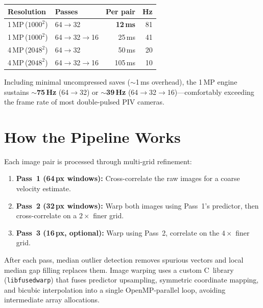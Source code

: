 \documentclass[10pt,a4paper,twocolumn]{article}
\begin{document}
\begin{center}
\small
\begin{tabular}{@{}llrr@{}}
\toprule
\textbf{Resolution} & \textbf{Passes} & \textbf{Per pair} & \textbf{Hz} \\
\midrule
1\,MP\,($1000^2$)  & 64$\to$32       & \textbf{12\,ms}  & 81 \\
1\,MP\,($1000^2$)  & 64$\to$32$\to$16 & 25\,ms          & 41 \\
4\,MP\,($2048^2$)  & 64$\to$32       & 50\,ms           & 20 \\
4\,MP\,($2048^2$)  & 64$\to$32$\to$16 & 105\,ms         & 10  \\
\bottomrule
\end{tabular}
\end{center}

Including minimal uncompressed saves (${\sim}$1\,ms overhead), the 1\,MP engine sustains \textbf{${\sim}$75\,Hz} (64$\to$32) or \textbf{${\sim}$39\,Hz} (64$\to$32$\to$16)---comfortably exceeding the frame rate of most double-pulsed PIV cameras.

\section{How the Pipeline Works}

Each image pair is processed through multi-grid refinement:

\begin{enumerate}[leftmargin=1.4em]
\item \textbf{Pass~1 (64\,px windows):} Cross-correlate the raw images for a coarse velocity estimate.
\item \textbf{Pass~2 (32\,px windows):} Warp both images using Pass~1's predictor, then cross-correlate on a $2\times$ finer grid.
\item \textbf{Pass~3 (16\,px, optional):} Warp using Pass~2, correlate on the $4\times$ finer grid.
\end{enumerate}

After each pass, median outlier detection removes spurious vectors and local median gap filling replaces them. Image warping uses a custom C~library (\texttt{libfusedwarp}) that fuses predictor upsampling, symmetric coordinate mapping, and bicubic interpolation into a single OpenMP-parallel loop, avoiding intermediate array allocations.
\end{document}

